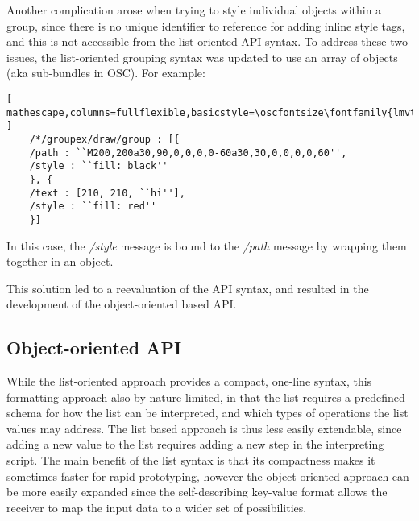 Another complication arose when trying to style individual objects within a group, since there is no unique identifier to reference for adding inline style tags, and this is not accessible from the list-oriented API syntax. To address these two issues, the list-oriented grouping syntax was updated to use an array of objects (aka sub-bundles in OSC). For example:
 
\begin{lstlisting}[ mathescape,columns=fullflexible,basicstyle=\oscfontsize\fontfamily{lmvtt}\selectfont ]
    /*/groupex/draw/group : [{
	/path : ``M200,200a30,90,0,0,0,0-60a30,30,0,0,0,0,60'',
	/style : ``fill: black''
    }, {
	/text : [210, 210, ``hi''],
	/style : ``fill: red''
    }]
\end{lstlisting}

\noindent
In this case, the \textit{/style} message is bound to the \textit{/path} message by wrapping them together in an object. 

This solution led to a reevaluation of the \drawsocket API syntax, and resulted in the development of the object-oriented based API.

\subsection{Object-oriented API}\label{sec:objstyle}
While the list-oriented approach provides a compact, one-line syntax, this formatting approach also by nature limited, in that the list requires a predefined schema for how the list can be interpreted, and which types of operations the list values may address. 
The list based approach is thus less easily extendable, since adding a new value to the list requires adding a new step in the interpreting script.
The main benefit of the list syntax is that its compactness makes it sometimes faster for rapid prototyping, however the object-oriented approach can be more easily expanded since the self-describing key-value format allows the receiver to map the input data to a wider set of possibilities.

